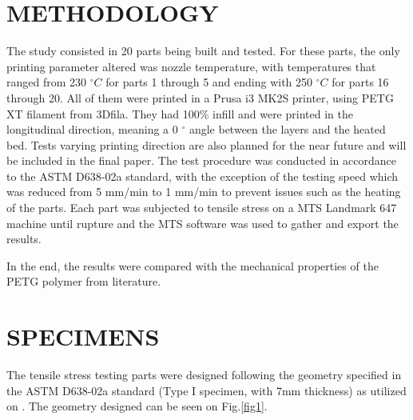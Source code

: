 \documentclass[10pt,fleqn,a4paper,twoside]{article}
\begin{document}
\section{METHODOLOGY}

The study consisted in 20 parts being built and tested. For these parts, the only printing parameter altered was nozzle temperature, with temperatures that ranged from 230 $^\circ C$ for parts 1 through 5 and ending with 250 $^\circ C$ for parts 16 through 20. All of them were printed in a Prusa i3 MK2S printer, using PETG XT filament from 3Dfila. They had 100\% infill and were printed in the longitudinal direction, meaning a 0 $^\circ$ angle between the layers and the heated bed. Tests varying printing direction are also planned for the near future and will be included in the final paper. 
The test procedure was conducted in accordance to the ASTM D638-02a standard, with the exception of the testing speed which was reduced from 5 mm/min to 1 mm/min to prevent issues such as the heating of the parts.
Each part was subjected to tensile stress on a MTS Landmark 647 machine until rupture and the MTS software was used to gather and export the results. 

In the end, the results were compared with the mechanical properties of the PETG polymer from literature. 



\section{SPECIMENS}

The tensile stress testing parts were designed following the geometry specified in the ASTM D638-02a standard (Type I specimen, with 7mm thickness) as utilized on \citep{test_on_fdm}. The geometry designed can be seen on Fig.\ref{fig1}.
\end{document}
